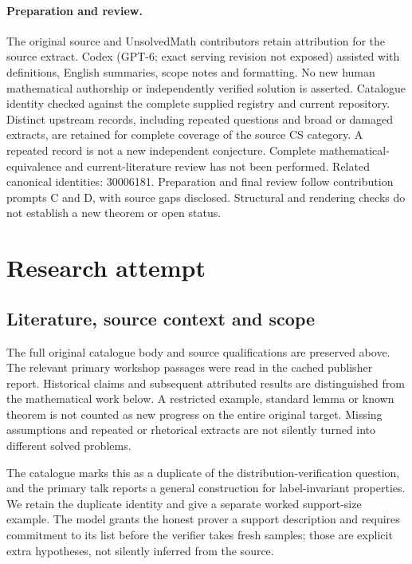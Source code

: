\documentclass[11pt]{article}
\begin{document}
\paragraph{Preparation and review.}
The original source and UnsolvedMath contributors retain attribution for the source extract. Codex (GPT-6; exact serving revision not exposed) assisted with definitions, English summaries, scope notes and formatting. No new human mathematical authorship or independently verified solution is asserted. Catalogue identity checked against the complete supplied registry and current repository. Distinct upstream records, including repeated questions and broad or damaged extracts, are retained for complete coverage of the source CS category. A repeated record is not a new independent conjecture. Complete mathematical-equivalence and current-literature review has not been performed. Related canonical identities: 30006181. Preparation and final review follow contribution prompts C and D, with source gaps disclosed. Structural and rendering checks do not establish a new theorem or open status.
\label{end:statement}

\section{Research attempt}
\subsection{Literature, source context and scope}
The full original catalogue body and source qualifications are preserved above. The relevant primary workshop passages were read in the cached publisher report. Historical claims and subsequent attributed results are distinguished from the mathematical work below. A restricted example, standard lemma or known theorem is not counted as new progress on the entire original target. Missing assumptions and repeated or rhetorical extracts are not silently turned into different solved problems.

The catalogue marks this as a duplicate of the distribution-verification question, and the primary talk reports a general construction for label-invariant properties. We retain the duplicate identity and give a separate worked support-size example. The model grants the honest prover a support description and requires commitment to its list before the verifier takes fresh samples; those are explicit extra hypotheses, not silently inferred from the source.
\end{document}
